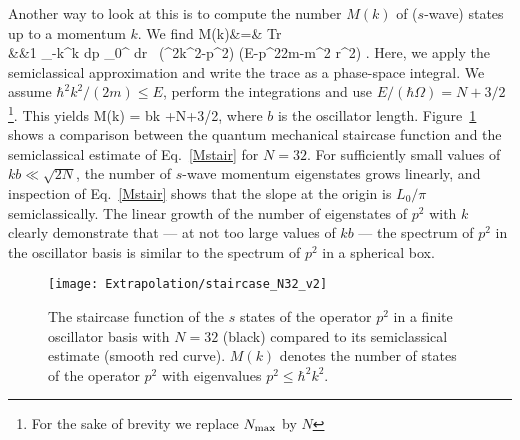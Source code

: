 	Another way to look at this is to compute the number $M(k)$ of ($s$-wave)
	states up to a momentum $k$.  We find
	\bea
	  M(k)&=& {\rm Tr} 
	  \nonumber\\
	  &\approx&{1\pi\hbar} \int\limits_{-\hbar k}^{\hbar k}\! dp
	  \int\limits_0^\infty\! dr \,
	   \Theta\left(\hbar^2k^2-p^2\right)
	   \Theta\left(E-{p^2\over 2m}-{m}\Omega^2 r^2\right)
	   \; .
	\eea
	Here, we apply the semiclassical approximation and write the trace
	as a phase-space integral.  We assume $\hbar^2k^2/(2m)\le
	E$, perform the integrations and use $E/(\hbar\Omega)= N+3/2$
	\footnote{For the sake of brevity we replace ${N_{\mathrm{max}}}$ by $N$}. This
	yields
	\bea
	  M(k) = {bk\pi}
	   +{N+3/2\over \pi}\;,
	  \label{Mstair}
	\eea
	where $b$ is the oscillator length.
	Figure~\ref{fig:staircase} shows a comparison between the quantum
	mechanical staircase function and the semiclassical
	estimate of Eq.~\eqref{Mstair} for $N=32$.  For sufficiently small values of
	$kb\ll\sqrt{2N}$, the number of $s$-wave momentum eigenstates grows
	linearly, and inspection of Eq.~\eqref{Mstair} shows that the slope at
	the origin is $L_0/\pi$ semiclassically.  The linear growth of the
	number of eigenstates of $p^2$ with $k$ clearly demonstrate that --- at
	not too large values of $kb$ --- the spectrum of $p^2$ in the oscillator
	basis is similar to the spectrum of $p^2$ in a spherical
	box.
	\begin{figure}[h]
	\centering
	\texttt{[image: Extrapolation/staircase\_N32\_v2]}
	\caption{The staircase function of the $s$ states of
	  the operator $p^2$ in a finite oscillator basis with $N=32$ (black)
	  compared to its semiclassical estimate (smooth red curve). $M(k)$
	  denotes the number of states of the operator $p^2$ with eigenvalues
	  $p^2\le\hbar^2 k^2$.}
	\label{fig:staircase}
	\end{figure}

